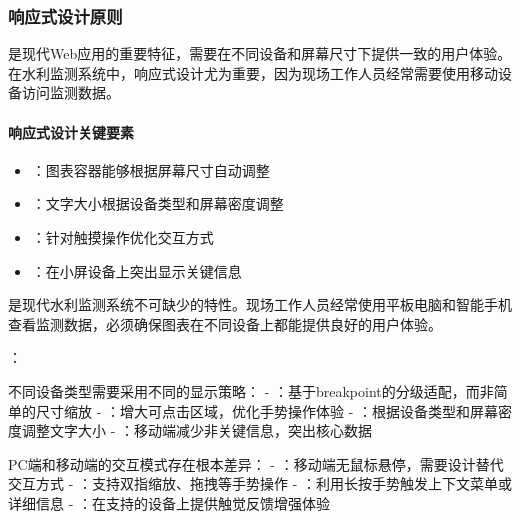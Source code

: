 \hypertarget{ux54cdux5e94ux5f0fux8bbeux8ba1ux539fux5219}{%
\subsubsection{响应式设计原则}\label{ux54cdux5e94ux5f0fux8bbeux8ba1ux539fux5219}}

是现代Web应用的重要特征，需要在不同设备和屏幕尺寸下提供一致的用户体验。在水利监测系统中，响应式设计尤为重要，因为现场工作人员经常需要使用移动设备访问监测数据。

\hypertarget{ux54cdux5e94ux5f0fux8bbeux8ba1ux5173ux952eux8981ux7d20}{%
\paragraph{响应式设计关键要素}\label{ux54cdux5e94ux5f0fux8bbeux8ba1ux5173ux952eux8981ux7d20}}

\begin{itemize}
\tightlist
\item
  ：图表容器能够根据屏幕尺寸自动调整
\item
  ：文字大小根据设备类型和屏幕密度调整
\item
  ：针对触摸操作优化交互方式
\item
  ：在小屏设备上突出显示关键信息
\end{itemize}

是现代水利监测系统不可缺少的特性。现场工作人员经常使用平板电脑和智能手机查看监测数据，必须确保图表在不同设备上都能提供良好的用户体验。

：


不同设备类型需要采用不同的显示策略： - ：基于breakpoint的分级适配，而非简单的尺寸缩放 - ：增大可点击区域，优化手势操作体验 - ：根据设备类型和屏幕密度调整文字大小 - ：移动端减少非关键信息，突出核心数据


PC端和移动端的交互模式存在根本差异： - ：移动端无鼠标悬停，需要设计替代交互方式 - ：支持双指缩放、拖拽等手势操作 - ：利用长按手势触发上下文菜单或详细信息 - ：在支持的设备上提供触觉反馈增强体验


